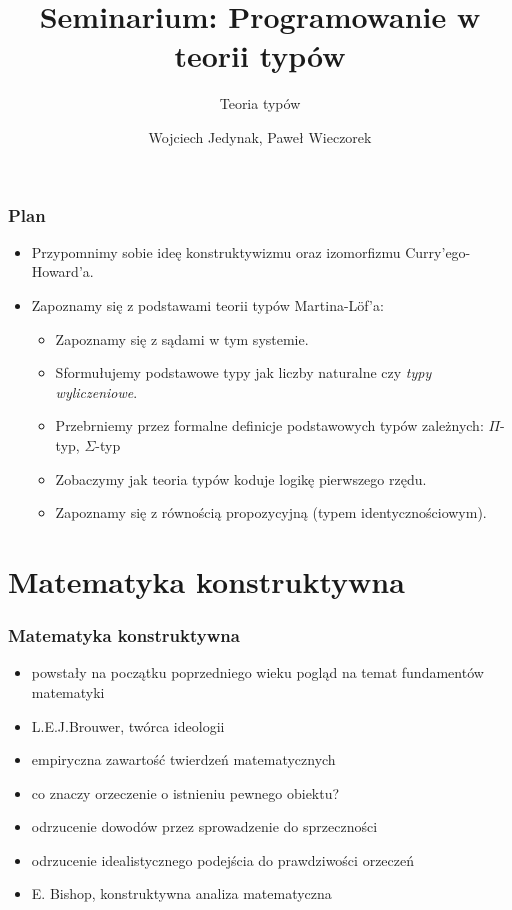 \documentclass{beamer}
\title{Seminarium: Programowanie w teorii typów}
\subtitle{Teoria typów}
\author{Wojciech Jedynak, Paweł Wieczorek}
\institute{Instytut Informatyki Uniwersytetu Wrocławskiego}
\begin{document}

\maketitle




\begin{frame}
\frametitle{Plan}

\begin{itemize}
 \item Przypomnimy sobie ideę konstruktywizmu oraz izomorfizmu Curry'ego-Howard'a.
 \item Zapoznamy się z podstawami teorii typów Martina-L\"{o}f'a:
 \begin{itemize}
 \item Zapoznamy się z sądami w tym systemie.
 \item Sformułujemy podstawowe typy jak liczby naturalne czy \emph{typy wyliczeniowe}.
 \item Przebrniemy przez formalne definicje podstawowych typów zależnych: $\Pi$-typ, $\Sigma$-typ
 \item Zobaczymy jak teoria typów koduje logikę pierwszego rzędu.
 \item Zapoznamy się z równością propozycyjną (typem identycznościowym).
 \end{itemize}
\end{itemize}

\end{frame}

\section{Matematyka konstruktywna}

\begin{frame}
\frametitle{Matematyka konstruktywna}

\begin{itemize}
 \item powstały na początku poprzedniego wieku pogląd na temat fundamentów matematyki
 \item L.E.J.Brouwer, twórca ideologii
 \item empiryczna zawartość twierdzeń matematycznych
 \item co znaczy orzeczenie o istnieniu pewnego obiektu?
 \item odrzucenie dowodów przez sprowadzenie do sprzeczności
 \item odrzucenie idealistycznego podejścia do prawdziwości orzeczeń
 \item E. Bishop, konstruktywna analiza matematyczna
\end{itemize}


\end{frame}
\end{document}
